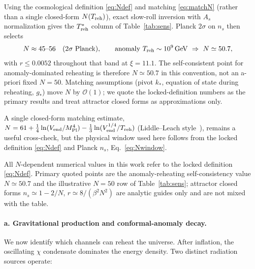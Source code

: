 \documentclass[pdflatex,sn-mathphys-num]{sn-jnl}
\newcommand{\MP}{M_{\rm Pl}}
\theoremstyle{thmstyleone}
\begin{document}
Using the cosmological definition \eqref{eq:Ndef} and matching \eqref{eq:matchN} (rather than a single closed-form $N(T_{\rm reh})$), exact slow-roll inversion with $A_s$ normalization gives the $T_{\rm reh}^*$ column of Table~\ref{tab:sens}. Planck $2\sigma$ on $n_s$ then selects
\begin{equation}
N\approx45\text{--}56\quad(2\sigma\ {\rm Planck}),\qquad
{\rm anomaly\ }T_{\rm reh}\sim10^9\,{\rm GeV}\ \Rightarrow\ N\simeq50.7,
\label{eq:Nwindow}
\end{equation}
with $r\leq0.0052$ throughout that band at $\xi=11.1$. The self-consistent point for anomaly-dominated reheating is therefore $N\simeq50.7$ in this convention, not an a-priori fixed $N=50$. Matching assumptions (pivot $k_*$, equation of state during reheating, $g_*$) move $N$ by $\mathcal{O}(1)$; we quote the locked-definition numbers as the primary results and treat attractor closed forms as approximations only.

A single closed-form matching estimate, $N=61+\frac14\ln(V_{\rm end}/\MP^4)-\frac13\ln(V_{\rm end}^{1/4}/T_{\rm reh})$ (Liddle--Leach style~\cite{LiddleLeach2003}), remains a useful cross-check, but the physical window used here follows from the locked definition \eqref{eq:Ndef} and Planck $n_s$, Eq.~\eqref{eq:Nwindow}.

All $N$-dependent numerical values in this work refer to the locked definition \eqref{eq:Ndef}. Primary quoted points are the anomaly-reheating self-consistency value $N\simeq50.7$ and the illustrative $N=50$ row of Table~\ref{tab:sens}; attractor closed forms $n_s\simeq1-2/N$, $r\simeq8/(\beta^2N^2)$ are analytic guides only and are not mixed with the table.

\paragraph{a. Gravitational production and conformal-anomaly decay.} We now identify which channels can reheat the universe. After inflation, the oscillating $\chi$ condensate dominates the energy density. Two distinct radiation sources operate:
\end{document}
